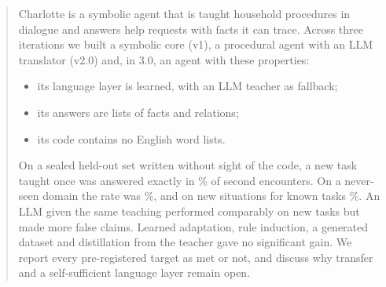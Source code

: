 \begin{abstract}
Charlotte is a symbolic agent that is taught household procedures in dialogue and answers help requests with facts it can trace. Across three iterations we built a symbolic core (v1), a procedural agent with an LLM translator (v2.0) and, in 3.0, an agent with these properties:
\begin{itemize}
  \item its language layer is learned, with an LLM teacher as fallback;
  \item its answers are lists of facts and relations;
  \item its code contains no English word lists.
\end{itemize}
On a sealed held-out set written without sight of the code, a new task taught once was answered exactly in \runHThreeRThreeFunctionTSecondRate\% of second encounters. On a never-seen domain the rate was \runHThreeRThreeFunctionGSecondRate\%, and on new situations for known tasks \runHThreeRThreeFunctionSFirstRate\%. An LLM given the same teaching performed comparably on new tasks but made more false claims. Learned adaptation, rule induction, a generated dataset and distillation from the teacher gave no significant gain. We report every pre-registered target as met or not, and discuss why transfer and a self-sufficient language layer remain open.
\end{abstract}
